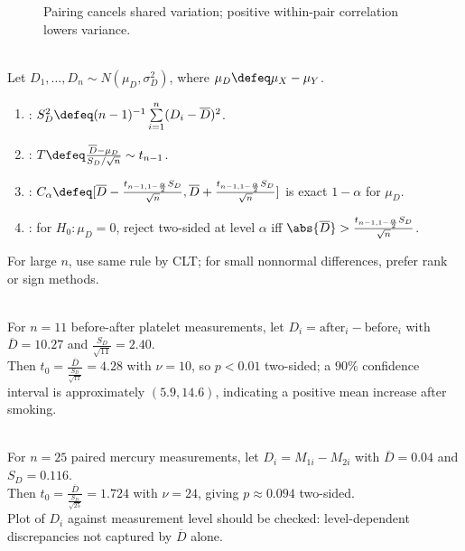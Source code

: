 \begin{figure}[H]
  \centering
  
  \caption{Pairing cancels shared variation; positive within-pair correlation lowers variance.}
  \label{fig:paired-vs-unpaired-variance}
\end{figure}

\begin{method} \label{meth:paired-normal-t-procedure} \\
Let $D_1,\ldots,D_n\sim N(\mu_D,\sigma_D^2)$, where $\mu_D\defeq\mu_X-\mu_Y$.
\begin{enumerate}[label=(\roman*)]
\setlength{\itemsep}{0pt}
\item {}: $S_D^2\defeq(n-1)^{-1}\sum\limits_{i=1}^n(D_i-\overline{D})^2$.
\item {}: $T\defeq\frac{\overline{D}-\mu_D}{S_D/\sqrt{n}}\sim t_{n-1}$.
\item {}: $C_\alpha\defeq[\overline{D}-\frac{t_{n-1,1-\frac{\alpha}{2}}S_D}{\sqrt{n}},\overline{D}+\frac{t_{n-1,1-\frac{\alpha}{2}}S_D}{\sqrt{n}}]$ is exact $1-\alpha$ for $\mu_D$.
\item {}: for $H_0:\mu_D=0$, reject two-sided at level $\alpha$ iff $\abs{\overline{D}}>\frac{t_{n-1,1-\frac{\alpha}{2}}S_D}{\sqrt{n}}$.
\end{enumerate}
For large $n$, use same rule by CLT; for small nonnormal differences, prefer rank or sign methods.
\end{method}

\begin{example} \label{ex:platelet-aggregation-paired-t} \\
For $n=11$ before-after platelet measurements, let $D_i=\mathrm{after}_i-\mathrm{before}_i$ with $\overline{D}=10.27$ and $\frac{S_D}{\sqrt{11}}=2.40$.\\
Then $t_0=\frac{\overline{D}}{\frac{S_D}{\sqrt{11}}}=4.28$ with $\nu=10$, so $p<0.01$ two-sided; a $90\%$ confidence interval is approximately $(5.9,14.6)$, indicating a positive mean increase after smoking.
\end{example}

\begin{example} \label{ex:mercury-methods-paired-analysis} \\
For $n=25$ paired mercury measurements, let $D_i=M_{1i}-M_{2i}$ with $\overline{D}=0.04$ and $S_D=0.116$.\\
Then $t_0=\frac{\overline{D}}{\frac{S_D}{\sqrt{25}}}=1.724$ with $\nu=24$, giving $p\approx0.094$ two-sided.\\
Plot of $D_i$ against measurement level should be checked: level-dependent discrepancies not captured by $\overline{D}$ alone.
\end{example}

